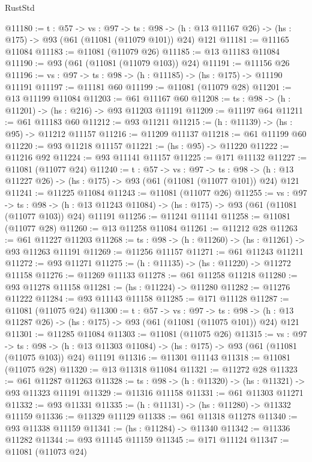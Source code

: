 \begin{lexlean}{RustStd}
\begin{coremodule}
@11180 := {t : @57} ->
  {vs : @97} ->
  {ts : @98} -> (h : @13 @11167 @26) -> (hs : @175) -> @93 (@61 (@11081 (@11079 @101)) @24) @121
@11181 := @11165 @11084
@11183 := @11081 (@11079 @26)
@11185 := @13 @11183 @11084
@11190 := @93 (@61 (@11081 (@11079 @103)) @24)
@11191 := @11156 @26
@11196 := {vs : @97} -> {ts : @98} -> (h : @11185) -> (hs : @175) -> @11190 @11191
@11197 := @11181 @60
@11199 := @11081 (@11079 @28)
@11201 := @13 @11199 @11084
@11203 := @61 @11167 @60
@11208 := {ts : @98} -> (h : @11201) -> (hs : @216) -> @93 @11203 @11191
@11209 := @11197 @64
@11211 := @61 @11183 @60
@11212 := @93 @11211
@11215 := (h : @11139) -> (hs : @95) -> @11212 @11157
@11216 := @11209 @11137
@11218 := @61 @11199 @60
@11220 := @93 @11218 @11157
@11221 := (hs : @95) -> @11220
@11222 := @11216 @92
@11224 := @93 @11141 @11157
@11225 := @171 @11132
@11227 := @11081 (@11077 @24)
@11240 := {t : @57} ->
  {vs : @97} ->
  {ts : @98} -> (h : @13 @11227 @26) -> (hs : @175) -> @93 (@61 (@11081 (@11077 @101)) @24) @121
@11241 := @11225 @11084
@11243 := @11081 (@11077 @26)
@11255 := {vs : @97} ->
  {ts : @98} ->
  (h : @13 @11243 @11084) -> (hs : @175) -> @93 (@61 (@11081 (@11077 @103)) @24) @11191
@11256 := @11241 @11141
@11258 := @11081 (@11077 @28)
@11260 := @13 @11258 @11084
@11261 := @11212 @28
@11263 := @61 @11227 @11203
@11268 := {ts : @98} -> (h : @11260) -> (hs : @11261) -> @93 @11263 @11191
@11269 := @11256 @11157
@11271 := @61 @11243 @11211
@11272 := @93 @11271
@11275 := (h : @11135) -> (hs : @11220) -> @11272 @11158
@11276 := @11269 @11133
@11278 := @61 @11258 @11218
@11280 := @93 @11278 @11158
@11281 := (hs : @11224) -> @11280
@11282 := @11276 @11222
@11284 := @93 @11143 @11158
@11285 := @171 @11128
@11287 := @11081 (@11075 @24)
@11300 := {t : @57} ->
  {vs : @97} ->
  {ts : @98} -> (h : @13 @11287 @26) -> (hs : @175) -> @93 (@61 (@11081 (@11075 @101)) @24) @121
@11301 := @11285 @11084
@11303 := @11081 (@11075 @26)
@11315 := {vs : @97} ->
  {ts : @98} ->
  (h : @13 @11303 @11084) -> (hs : @175) -> @93 (@61 (@11081 (@11075 @103)) @24) @11191
@11316 := @11301 @11143
@11318 := @11081 (@11075 @28)
@11320 := @13 @11318 @11084
@11321 := @11272 @28
@11323 := @61 @11287 @11263
@11328 := {ts : @98} -> (h : @11320) -> (hs : @11321) -> @93 @11323 @11191
@11329 := @11316 @11158
@11331 := @61 @11303 @11271
@11332 := @93 @11331
@11335 := (h : @11131) -> (hs : @11280) -> @11332 @11159
@11336 := @11329 @11129
@11338 := @61 @11318 @11278
@11340 := @93 @11338 @11159
@11341 := (hs : @11284) -> @11340
@11342 := @11336 @11282
@11344 := @93 @11145 @11159
@11345 := @171 @11124
@11347 := @11081 (@11073 @24)

\end{coremodule}
\end{lexlean}
